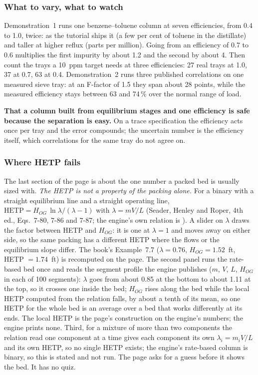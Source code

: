 \documentclass[11pt,a4paper]{article}
\begin{document}
\subsubsection*{What to vary, what to watch}

\begin{tryit}
Demonstration~1 runs one benzene--toluene column at seven efficiencies, from
0.4 to 1.0, twice: as the tutorial ships it (a few per cent of toluene in the
distillate) and taller at higher reflux (parts per million).  Going from an
efficiency of 0.7 to 0.6 multiplies the first impurity by about 1.2 and the
second by about 4.  Then count the trays a 10~ppm target needs at three
efficiencies: 27 real trays at 1.0, 37 at 0.7, 63 at 0.4.  Demonstration~2
runs three published correlations on one measured sieve tray: at an F-factor
of 1.5 they span about 28 points, while the measured efficiency stays between
63 and 74\,\% over the normal range of load.
\end{tryit}

\begin{pitfall}
\textbf{That a column built from equilibrium stages and one efficiency is safe
because the separation is easy.}  On a trace specification the efficiency acts
once per tray and the error compounds; the uncertain number is the efficiency
itself, which correlations for the same tray do not agree on.
\end{pitfall}

\subsubsection*{Where HETP fails}

The last section of the page is about the one number a packed bed is usually
sized with.  \emph{The HETP is not a property of the packing alone.}  For a
binary with a straight equilibrium line and a straight operating line,
$\mathrm{HETP} = H_{OG}\,\ln\lambda/(\lambda-1)$ with $\lambda = mV/L$
(Seader, Henley and Roper, 4th ed., Eqs.~7-80, 7-86 and 7-87; the engine's own
relation is ).  A slider on $\lambda$ draws the
factor between HETP and $H_{OG}$: it is one at $\lambda=1$ and moves away on
either side, so the same packing has a different HETP where the flows or the
equilibrium slope differ.  The book's Example~7.7 ($\lambda=0.76$, $H_{OG}=1.52$~ft,
HETP $=1.74$~ft) is recomputed on the page.  The second panel runs the
rate-based bed once and reads the segment profile the engine publishes
($m$, $V$, $L$, $H_{OG}$ in each of 100 segments): $\lambda$ goes from about
0.85 at the bottom to about 1.11 at the top, so it crosses one inside the bed;
$H_{OG}$ rises along the bed while the local HETP computed from the relation
falls, by about a tenth of its mean, so one HETP for the whole bed is an average
over a bed that works differently at its ends.  The local HETP is the page's
construction on the engine's numbers; the engine prints none.  Third, for a
mixture of more than two components the relation read one component at a time
gives each component its own $\lambda_i = m_iV/L$ and its own HETP, so no single
HETP exists; the engine's rate-based column is binary, so this is stated and not
run.  The page asks for a guess before it shows the bed.  It has no quiz.
\end{document}
